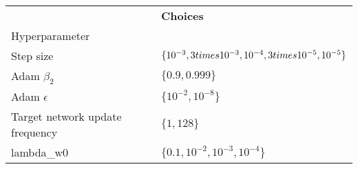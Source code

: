 \begin{tabular}{ll}
 & \bfseries Choices \\
Hyperparameter &  \\
Step size & $\{10^{-3}, 3 \\times 10^{-3}, 10^{-4}, 3 \\times 10^{-5}, 10^{-5}\}$ \\
Adam $\beta_2$ & $\{0.9, 0.999\}$ \\
Adam $\epsilon$ & $\{10^{-2}, 10^{-8}\}$ \\
Target network update frequency & $\{1, 128\}$ \\
lambda_w0 & $\{0.1, 10^{-2}, 10^{-3}, 10^{-4}\}$ \\
\end{tabular}

